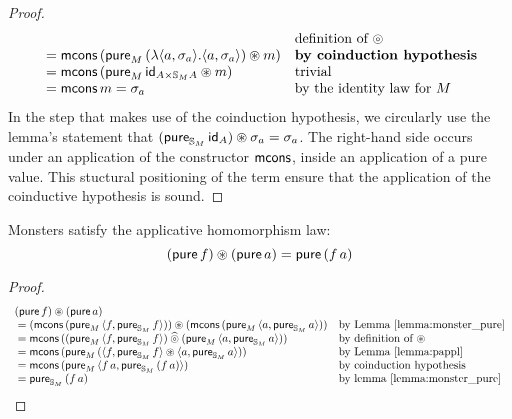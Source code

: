 \begin{proof}
$$\begin{array}{ll}
  & \mbox{definition of }\circledcirc\\
{}= \mathsf{mcons}\,(\mathsf{pure}_M\,(\lambda \langle a,\sigma_a\rangle. \langle a, \sigma_a\rangle) \circledast m)
  & \mbox{\bf by coinduction hypothesis}\\
{}= \mathsf{mcons}\,(\mathsf{pure}_M\,\mathsf{id}_{A\times\mathbb{S}_{M}A} \circledast m)
  & \mbox{trivial}\\
{}= \mathsf{mcons}\,m = \sigma_a
  & \mbox{by the identity law for }M
\end{array}
$$
In the step that makes use of the coinduction hypothesis, we circularly use the lemma's statement that $(\mathsf{pure}_{\mathbb{S}_{M}}\,\mathsf{id}_A) \circledast \sigma_a = \sigma_a$.
The right-hand side occurs under an application of the constructor $\mathsf{mcons}$, inside an application of a pure value. 
This stuctural positioning of the term ensure that the application of the coinductive hypothesis is sound.

\end{proof}

\begin{lemma}
Monsters satisfy the applicative homomorphism law:
$$
(\mathsf{pure}\,f) \circledast (\mathsf{pure}\,a) = \mathsf{pure}\,(f\,a)
$$
\end{lemma}
\begin{proof}
$$
\begin{array}{ll}
(\mathsf{pure}\,f) \circledast (\mathsf{pure}\,a)\\
{}= (\mathsf{mcons}\,(\mathsf{pure}_M\,\langle f, \mathsf{pure}_{\mathbb{S}_{M}}\,f\rangle)) \circledast
    (\mathsf{mcons}\,(\mathsf{pure}_M\,\langle a, \mathsf{pure}_{\mathbb{S}_{M}}\,a\rangle))
  & \mbox{by Lemma \ref{lemma:monster_pure}}\\
{}= \mathsf{mcons}\,((\mathsf{pure}_M\,\langle f, \mathsf{pure}_{\mathbb{S}_{M}}\,f\rangle) \mathbin{\widehat{\circledcirc}}
             (\mathsf{pure}_M\,\langle a, \mathsf{pure}_{\mathbb{S}_{M}}\,a\rangle))
  & \mbox{by definition of }\circledast\\
{}= \mathsf{mcons}\,(\mathsf{pure}_M\,(\langle f, \mathsf{pure}_{\mathbb{S}_{M}}\,f\rangle \circledast \langle a, \mathsf{pure}_{\mathbb{S}_{M}}\,a\rangle))
  & \mbox{by Lemma }\ref{lemma:pappl}\\
{}= \mathsf{mcons}\,(\mathsf{pure}_M\,\langle f\,a, \mathsf{pure}_{\mathbb{S}_{M}}\,(f\,a)\rangle)
  & \mbox{by coinduction hypothesis}\\
{}= \mathsf{pure}_{\mathbb{S}_{M}}\,(f\,a)
  & \mbox{by lemma }\ref{lemma:monster_pure}
\end{array}
$$
\end{proof}




